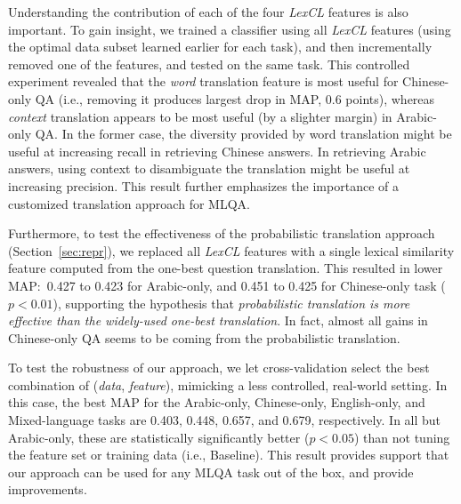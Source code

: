 \documentclass{sig-alternate-05-2015}
\begin{document}
Understanding the contribution of each of the four \emph{LexCL} features is also important. To gain insight, we 
trained a classifier using all {\em LexCL} features (using the optimal data subset learned earlier for each task), and then 
incrementally removed one of the features, and tested on the same task. 
This controlled experiment revealed that the \emph{word} translation feature is most useful for Chinese-only 
QA (i.e., removing it produces largest drop in MAP, 0.6 points), whereas \emph{context} translation appears 
to be most useful (by a slighter margin) in Arabic-only QA. In the former case, the diversity provided by
word translation might be useful at increasing recall in retrieving Chinese answers. In retrieving Arabic
answers, using context to disambiguate the translation might be useful at increasing precision. This result
further emphasizes the importance of a customized translation approach for MLQA.

Furthermore, to test the effectiveness of the 
probabilistic translation approach (Section~\ref{sec:repr}), we replaced all {\em LexCL} features with a 
single lexical similarity feature computed from the one-best question translation. This resulted
in lower MAP:\ 0.427 to 0.423 for Arabic-only, and 0.451 to 0.425 for Chinese-only task ($p < 0.01$), 
supporting the hypothesis that \emph{probabilistic translation is more effective than the widely-used 
one-best translation}. In fact, almost all gains in Chinese-only QA seems to be coming from the
probabilistic translation.

To test the robustness of our approach, we let cross-validation select the best combination of 
(\emph{data}, \emph{feature}), mimicking a less controlled, real-world setting. In this case, the best 
MAP for the Arabic-only, Chinese-only, English-only, and Mixed-language tasks are 0.403, 0.448, 0.657, and 
0.679, respectively. In all but Arabic-only, these are statistically significantly better ($p < 0.05$) than 
not tuning the feature set or training data (i.e., Baseline). This result provides support that our approach
can be used for any MLQA task out of the box, and provide improvements.
\end{document}
